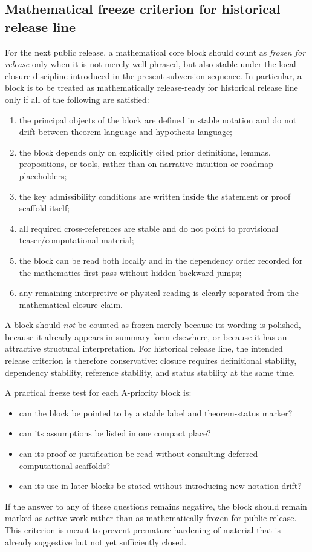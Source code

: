 \documentclass[12pt,a4paper]{article}
\DeclareRobustCommand{\QSCver}[1]{archival stage}
\renewcommand{\QSCver}[1]{historical release line}
\begin{document}
\subsection*{Mathematical freeze criterion for \QSCver{v2.27.0}}
For the next public release, a mathematical core block should count as \emph{frozen for release} only when it is not merely well phrased, but also stable under the local closure discipline introduced in the present subversion sequence. In particular, a block is to be treated as mathematically release-ready for \QSCver{v2.27.0} only if all of the following are satisfied:
\begin{enumerate}[leftmargin=*]
 \item the principal objects of the block are defined in stable notation and do not drift between theorem-language and hypothesis-language;
 \item the block depends only on explicitly cited prior definitions, lemmas, propositions, or tools, rather than on narrative intuition or roadmap placeholders;
 \item the key admissibility conditions are written inside the statement or proof scaffold itself;
 \item all required cross-references are stable and do not point to provisional teaser/computational material;
 \item the block can be read both locally and in the dependency order recorded for the mathematics-first pass without hidden backward jumps;
 \item any remaining interpretive or physical reading is clearly separated from the mathematical closure claim.
\end{enumerate}
A block should \emph{not} be counted as frozen merely because its wording is polished, because it already appears in summary form elsewhere, or because it has an attractive structural interpretation. For \QSCver{v2.27.0}, the intended release criterion is therefore conservative: closure requires definitional stability, dependency stability, reference stability, and status stability at the same time.

A practical freeze test for each A-priority block is:
\begin{itemize}[leftmargin=*]
 \item can the block be pointed to by a stable label and theorem-status marker?
 \item can its assumptions be listed in one compact place?
 \item can its proof or justification be read without consulting deferred computational scaffolds?
 \item can its use in later blocks be stated without introducing new notation drift?
\end{itemize}
If the answer to any of these questions remains negative, the block should remain marked as active work rather than as mathematically frozen for public release. This criterion is meant to prevent premature hardening of material that is already suggestive but not yet sufficiently closed.
\end{document}
